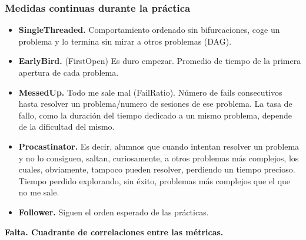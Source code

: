 \subsubsection{Medidas continuas durante la práctica}

\begin{itemize}
\item \textbf{SingleThreaded.} Comportamiento ordenado sin bifurcaciones, coge un problema y lo termina sin mirar a otros problemas (DAG).
\item \textbf{EarlyBird.} (FirstOpen) Es duro empezar. Promedio de tiempo de la primera apertura de cada problema.
\item \textbf{MessedUp.} Todo me sale mal (FailRatio). Número de fails consecutivos hasta resolver un problema/numero de sesiones de ese problema. La tasa de fallo, como la duración del tiempo dedicado a un mismo problema, depende de la dificultad del mismo.
\item \textbf{Procastinator.} Es decir, alumnos que cuando intentan resolver un problema y no lo consiguen, saltan, curiosamente, a otros problemas más complejos, los cuales, obviamente, tampoco pueden resolver, perdiendo un tiempo precioso. Tiempo perdido explorando, sin éxito, problemas más complejos que el que no me sale.
\item \textbf{Follower.} Siguen el orden esperado de las prácticas.
\end{itemize}

\textbf{Falta. Cuadrante de correlaciones entre las métricas.}
